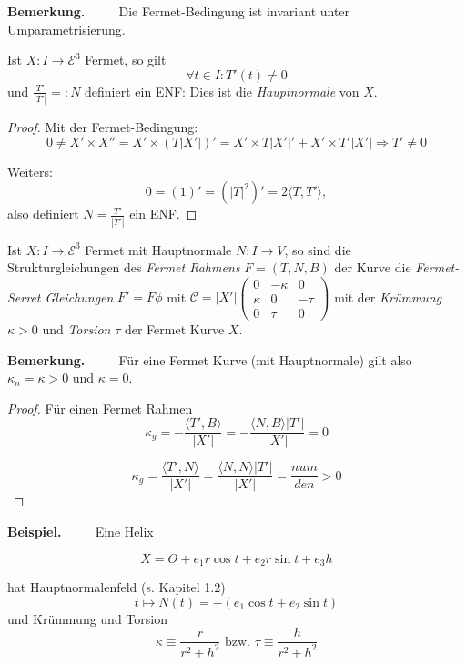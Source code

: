 \documentclass[a4paper,oneside,11pt,DIV=12,parskip=half]{scrartcl}
\newcommand{\E}{\mathcal E}
\newenvironment{note}{\textbf{Bemerkung.} ~~~~}{}
\newenvironment{example}{\textbf{Beispiel.} ~~~~}{}
\newenvironment{lemma, definition}{\textbf{Lemma und Definition.} ~~~~}{}
\newenvironment{note, example}{\textbf{Bemerkung und Beispiel.} ~~~~}{}
\newenvironment{note, definition}{\textbf{Bemerkung und Definition.} ~~~~}{}
\begin{document}
\begin{note}
	Die Fermet-Bedingung ist invariant unter Umparametrisierung.
\end{note}

\begin{lemma, definition}
	Ist $X: I \rightarrow \E^3$ Fermet, so gilt \[ \forall t \in I : T'(t) \not = 0 \] und $\frac{T'}{|T'|} =: N$ definiert ein ENF: Dies ist die \textit{Hauptnormale} von $X$.
\end{lemma, definition}

\begin{proof}
	Mit der Fermet-Bedingung:
	\[0 \not = X' \times X''= X' \times (T|X'|)' = X' \times T|X'|' + X'\times T'|X'| \Rightarrow T' \not = 0 \]
	
	Weiters: \[ 0 = (1)' = (|T|^2)' = 2\langle T,T' \rangle, \]
	also definiert $N = \frac{T'}{|T'|}$ ein ENF.
\end{proof}

\begin{lemma, definition}
	Ist $X: I \rightarrow \E^3$ Fermet mit Hauptnormale $N: I \rightarrow V$, so sind die Strukturgleichungen des \textit{Fermet Rahmens} $F = (T,N,B)$ der Kurve die \textit{Fermet-Serret Gleichungen} $F' = F\phi$ mit $\mathcal{C} = |X'|\begin{pmatrix}
	0 & - \kappa & 0\\
	\kappa & 0 & - \tau \\
	0 & \tau & 0
	\end{pmatrix}$
	 mit der \textit{Krümmung} $\kappa > 0$ und \textit{Torsion} $\tau$ der Fermet Kurve $X$.
\end{lemma, definition}

\begin{note}
	Für eine Fermet Kurve (mit Hauptnormale) gilt also $\kappa_n = \kappa > 0$ und $\kappa = 0$.
\end{note}

\begin{proof}
	Für einen Fermet Rahmen \[ \kappa_g = - \frac{\langle T', B \rangle}{|X'|} = - \frac{\langle N, B \rangle |T'|}{|X'|} = 0 \]
	
	\[ \kappa_g = \frac{\langle T', N \rangle}{|X'|} = \frac{\langle N, N \rangle |T'|}{|X'|} = \frac{num}{den} >0 \]
\end{proof}

\begin{example}
	Eine Helix
	
	\[ X = O + e_1 r \cos t + e_2 r \sin t + e_3 h \]
	
	hat Hauptnormalenfeld (s. Kapitel 1.2) \[ t \mapsto N(t) = - (e_1 \cos t + e_2 \sin t) \] und Krümmung und Torsion 
	\[ \kappa \equiv \frac{r}{r^2 +h^2} \text{ bzw. } \tau \equiv \frac{h}{r^2+h^2}  \]
\end{example}
\end{document}
